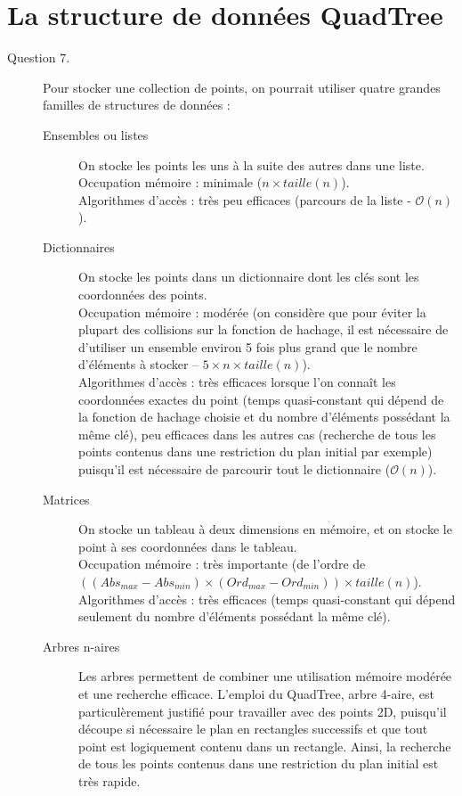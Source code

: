 \documentclass[11pt]{scrartcl}
\begin{document}
\section{La structure de données QuadTree}

\begin{description}
\item[Question 7.] Pour stocker une collection de points, on pourrait utiliser quatre grandes familles de structures de données :
\begin{description}
\item[Ensembles ou listes] On stocke les points les uns à la suite des autres dans une liste.\\
Occupation mémoire : minimale ($n \times taille(n)$).\\
Algorithmes d'accès : très peu efficaces (parcours de la liste - $\mathcal{O}(n)$).
\item[Dictionnaires] On stocke les points dans un dictionnaire dont les clés sont les coordonnées des points.\\
Occupation mémoire : modérée (on considère que pour éviter la plupart des collisions sur la fonction de hachage, il est nécessaire de d'utiliser un ensemble environ 5 fois plus grand que le nombre d'éléments à stocker -- $5 \times n \times taille(n)$).\\
Algorithmes d'accès : très efficaces lorsque l'on connaît les coordonnées exactes du point (temps quasi-constant qui dépend de la fonction de hachage choisie et du nombre d'éléments possédant la même clé), peu efficaces dans les autres cas (recherche de tous les points contenus dans une restriction du plan initial par exemple) puisqu'il est nécessaire de parcourir tout le dictionnaire ($\mathcal{O}(n)$).
\item[Matrices] On stocke un tableau à deux dimensions en mémoire, et on stocke le point à ses coordonnées dans le tableau.\\
Occupation mémoire : très importante (de l'ordre de $((Abs_{max} - Abs_{min}) \times (Ord_{max} - Ord_{min})) \times taille(n)$).\\
Algorithmes d'accès : très efficaces (temps quasi-constant qui dépend seulement du nombre d'éléments possédant la même clé).
\item[Arbres n-aires] Les arbres permettent de combiner une utilisation mémoire modérée et une recherche efficace. L'emploi du QuadTree, arbre 4-aire, est particulèrement justifié pour travailler avec des points 2D, puisqu'il découpe si nécessaire le plan en rectangles successifs et que tout point est logiquement contenu dans un rectangle. Ainsi, la recherche de tous les points contenus dans une restriction du plan initial est très rapide.\\

\end{description}
\end{description}
\end{document}
